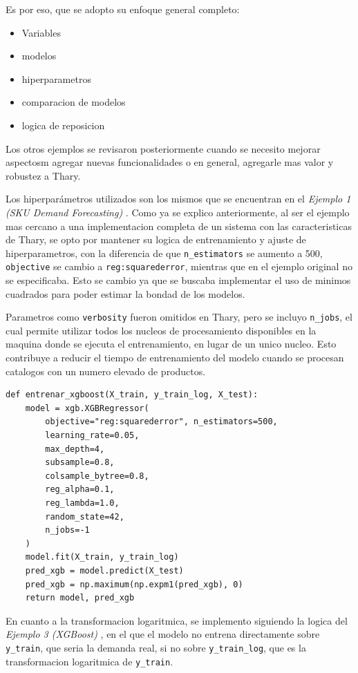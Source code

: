 Es por eso, que se adopto su enfoque general completo:

\begin{itemize}
    \item Variables
    \item modelos
    \item hiperparametros
    \item comparacion de modelos
    \item logica de reposicion
\end{itemize}

Los otros ejemplos se revisaron posteriormente cuando se necesito mejorar aspectosm agregar nuevas funcionalidades o en general, agregarle mas valor y robustez a Thary.

Los hiperparámetros utilizados son los mismos que se encuentran en el \textit{Ejemplo 1 (SKU Demand Forecasting)} \cite{ejemplo1_demandforecast}. Como ya se explico anteriormente, al ser el ejemplo mas cercano a una implementacion completa de un sistema con las caracteristicas de Thary, se opto por mantener su logica de entrenamiento y ajuste de hiperparametros, con la diferencia de que \texttt{n\_estimators} se aumento a 500, \texttt{objective} se cambio a \texttt{reg:squarederror}, mientras que en el ejemplo original no se especificaba. Esto se cambio ya que se buscaba implementar el uso de minimos cuadrados para poder estimar la bondad de los modelos.

Parametros como \texttt{verbosity} fueron omitidos en Thary, pero se incluyo \texttt{n\_jobs}, el cual permite utilizar todos los nucleos de procesamiento disponibles en la maquina donde se ejecuta el entrenamiento, en lugar de un unico nucleo. Esto contribuye a reducir el tiempo de entrenamiento del modelo cuando se procesan catalogos con un numero elevado de productos.

\begin{verbatim}
def entrenar_xgboost(X_train, y_train_log, X_test):
    model = xgb.XGBRegressor(
        objective="reg:squarederror", n_estimators=500, 
        learning_rate=0.05,
        max_depth=4, 
        subsample=0.8, 
        colsample_bytree=0.8,
        reg_alpha=0.1, 
        reg_lambda=1.0, 
        random_state=42, 
        n_jobs=-1
    )
    model.fit(X_train, y_train_log)
    pred_xgb = model.predict(X_test)
    pred_xgb = np.maximum(np.expm1(pred_xgb), 0)
    return model, pred_xgb
\end{verbatim}

En cuanto a la transformacion logaritmica, se implemento siguiendo la logica del \textit{Ejemplo 3 (XGBoost)} \cite{ejemplo3_ksmooi_inventorydemand}, en el que el modelo no entrena directamente sobre \texttt{y\_train}, que seria la demanda real, si no sobre \texttt{y\_train\_log}, que es la transformacion logaritmica de \texttt{y\_train}. 

